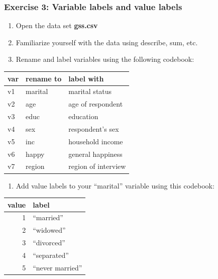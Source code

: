 \documentclass[table]{beamer}
\begin{document}
\begin{frame}
\frametitle{Exercise 3: Variable labels and value labels}
\label{sec-4-3}

\begin{enumerate}
\item Open the data set \textbf{gss.csv}
\item Familiarize yourself with the  data using describe, sum, etc.
\item Rename and label variables using the following codebook:
\end{enumerate}
{ \scriptsize

\begin{center}
\begin{tabular}{lll}
 \textbf{var}  &  \textbf{rename to}  &  \textbf{label with}  \\
\hline
 v1            &  marital             &  marital status       \\
 v2            &  age                 &  age of respondent    \\
 v3            &  educ                &  education            \\
 v4            &  sex                 &  respondent's sex     \\
 v5            &  inc                 &  household income     \\
 v6            &  happy               &  general happiness    \\
 v7            &  region              &  region of interview  \\
\hline
\end{tabular}
\end{center}


} 
\begin{enumerate}
\item Add value labels to your ``marital'' variable using this codebook:
\end{enumerate}
{ \scriptsize

\begin{center}
\begin{tabular}{rl}
 \textbf{value}  &  \textbf{label}     \\
\hline
              1  &  ``married''        \\
              2  &  ``widowed''        \\
              3  &  ``divorced''       \\
              4  &  ``separated''      \\
              5  &  ``never married''  \\
\hline
\end{tabular}
\end{center}


} 
\end{frame}
\end{document}
